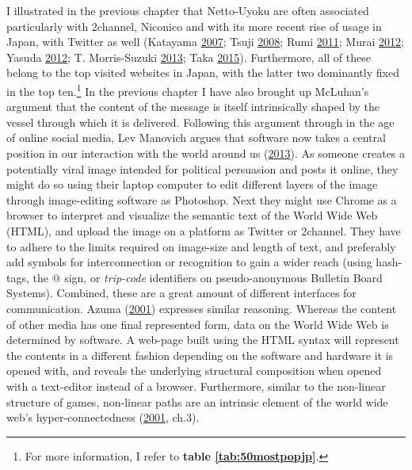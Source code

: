 \documentclass[10pt,british,A4paper,,openany]{memoir}
\begin{document}
I illustrated in the previous chapter that Netto-Uyoku are often
associated particularly with 2channel, Niconico and with its more recent
rise of usage in Japan, with Twitter as well (Katayama
\protect\hyperlink{ref-katayama_2-channel_2007}{2007}; Tsuji
\protect\hyperlink{ref-tsuji_eng:_2008}{2008}; Rumi
\protect\hyperlink{ref-rumi_koreans_2011}{2011}; Murai
\protect\hyperlink{ref-murai_net_2012}{2012}; Yasuda
\protect\hyperlink{ref-yasuda_eng:_2012}{2012}; T. Morris-Suzuki
\protect\hyperlink{ref-morris-suzuki_freedom_2013}{2013}; Taka
\protect\hyperlink{ref-taka_twitter_2015-1}{2015}). Furthermore, all of
these belong to the top visited websites in Japan, with the latter two
dominantly fixed in the top ten.\footnote{For more information, I refer
  to \textbf{table \ref{tab:50mostpopjp}}.} In the previous chapter I
have also brought up McLuhan's argument that the content of the message
is itself intrinsically shaped by the vessel through which it is
delivered. Following this argument through in the age of online social
media, Lev Manovich argues that software now takes a central position in
our interaction with the world around us
(\protect\hyperlink{ref-manovich_software_2013}{2013}). As someone
creates a potentially viral image intended for political persuasion and
posts it online, they might do so using their laptop computer to edit
different layers of the image through image-editing software as
Photoshop. Next they might use Chrome as a browser to interpret and
visualize the semantic text of the World Wide Web (HTML), and upload the
image on a platform as Twitter or 2channel. They have to adhere to the
limits required on image-size and length of text, and preferably add
symbols for interconnection or recognition to gain a wider reach (using
hash-tags, the @ sign, or \emph{trip-code} identifiers on
pseudo-anonymous Bulletin Board Systems). Combined, these are a great
amount of different interfaces for communication. Azuma
(\protect\hyperlink{ref-azuma_otaku:_2001}{2001}) expresses similar
reasoning. Whereas the content of other media has one final represented
form, data on the World Wide Web is determined by software. A web-page
built using the HTML syntax will represent the contents in a different
fashion depending on the software and hardware it is opened with, and
reveals the underlying structural composition when opened with a
text-editor instead of a browser. Furthermore, similar to the non-linear
structure of games, non-linear paths are an intrinsic element of the
world wide web's hyper-connectedness
(\protect\hyperlink{ref-azuma_otaku:_2001}{2001}, ch.3).
\end{document}
